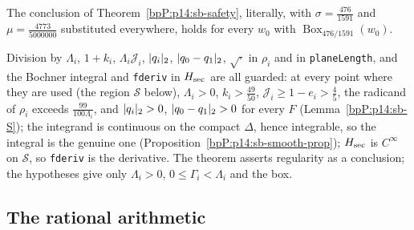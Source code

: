 \begin{theorem}\label{bpP:p14:sb-cited}
The conclusion of Theorem~\ref{bpP:p14:sb-safety}, literally, with $\sigma=\frac{476}{1591}$ and $\mu=\frac{4773}{5000000}$ substituted everywhere, holds for every $w_0$ with $\operatorname{Box}_{476/1591}(w_0)$.
\end{theorem}

\begin{remark}\label{bpP:p14:sb-totality}
Division by $\Lambda_i$, $1+k_i$, $\Lambda_i\mathcal J_i$, $\lvert q_i\rvert_2$, $\lvert q_0-q_1\rvert_2$, $\sqrt{\cdot}$ in $\rho_i$ and in \texttt{planeLength}, and the Bochner integral and \texttt{fderiv} in $H_{\rm sec}$ are all guarded:
at every point where they are used (the region $\mathcal S$ below), $\Lambda_i>0$, $k_i>\frac{49}{50}$, $\mathcal J_i\ge1-e_i>\frac45$, the radicand of $\rho_i$ exceeds $\frac{99}{100\Lambda_i}$, and
$\lvert q_i\rvert_2>0$, $\lvert q_0-q_1\rvert_2>0$ for every $F$ (Lemma~\ref{bpP:p14:sb-S}); the integrand is continuous on the compact $\Delta$, hence integrable, so the integral is the genuine one (Proposition~\ref{bpP:p14:sb-smooth-prop}); $H_{\rm sec}$ is $C^\infty$ on $\mathcal S$, so \texttt{fderiv} is the derivative.
The theorem asserts regularity as a conclusion; the hypotheses give only $\Lambda_i>0$, $0\le\Gamma_i<\Lambda_i$ and the box.
\end{remark}

\subsection{The rational arithmetic}\label{bpP:p14:sb-num}

